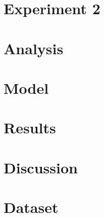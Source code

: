 \documentclass{article}
\begin{document}
\section{Experiment 2}\label{sec:}

\section{Analysis}\label{sec:}

\section{Model}\label{sec:}

\section{Results}\label{sec:}

\section{Discussion}\label{sec:}






\Appendix

\section{Dataset}


%
%
%
%
\end{document}
